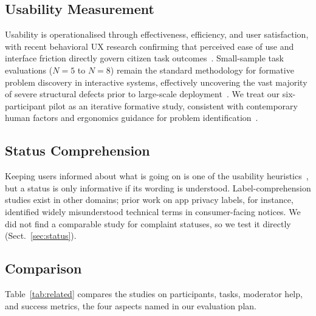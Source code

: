 \documentclass[11pt, runningheads, a4paper]{llncs}
\begin{document}
\subsection{Usability Measurement}
Usability is operationalised through effectiveness, efficiency, and user satisfaction, with recent behavioral
UX research confirming that perceived ease of use and interface friction directly govern citizen task
outcomes~\cite{lewis2024}. Small-sample task evaluations ($N=5$ to $N=8$) remain the standard methodology
for formative problem discovery in interactive systems, effectively uncovering the vast majority of
severe structural defects prior to large-scale deployment~\cite{lewis2021}. We treat our six-participant
pilot as an iterative formative study, consistent with contemporary human factors and ergonomics guidance
for problem identification~\cite{lewis2021}.

\subsection{Status Comprehension}
Keeping users informed about what is going on is one of the usability
heuristics~\cite{nielsen1994}, but a status is only informative if its wording is
understood. Label-comprehension studies exist in other domains; prior work on
app privacy labels, for instance, identified widely misunderstood technical terms
in consumer-facing notices. We did not find a comparable study for complaint
statuses, so we test it directly (Sect.~\ref{sec:status}).

\subsection{Comparison}
Table~\ref{tab:related} compares the studies on participants, tasks, moderator
help, and success metrics, the four aspects named in our evaluation plan.
\end{document}
